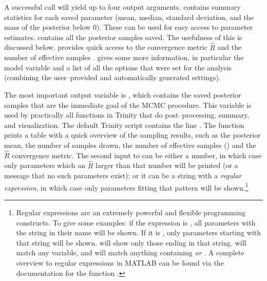 A successful  call will yield up to four output arguments.  contains summary statistics for each saved parameter (mean, median, standard deviation, and the mass of the posterior below 0). These can be used for easy access to parameter estimates.  contains all the posterior samples saved. The usefulness of this is discussed below.  provides quick access to the convergence metric $\hat{R}$ and the number of effective samples \cite{GelmanRubin1999}.  gives some more information, in particular the model variable and a list of all the options that were set for the analysis (combining the user--provided and automatically generated settings).

The most important output variable is , which contains the saved posterior samples that are the immediate goal of the MCMC procedure. This variable is used by practically all functions in Trinity that do post--processing, summary, and visualization. The default Trinity script contains the line . The  function prints a table with a quick overview of the sampling results, such as the posterior mean, the number of samples drawn, the number of effective samples () and the $\hat{R}$ convergence metric. The second input to  can be either a number, in which case only parameters which an $\hat{R}$ larger than that number will be printed (or a message that no such parameters exist); or it can be a string with a \emph{regular expression}, in which case only parameters fitting that pattern will be shown.\footnote{Regular expressions are an extremely powerful and flexible programming constructs. To give some examples: if the expression is , all parameters with the string  in their name will be shown. If it is , only parameters starting with that string will be shown.  will show only those ending in that string.  will match any variable, and  will match anything containing  \emph{or} . A complete overview to regular expressions in MATLAB can be found via the documentation for the function .} 

